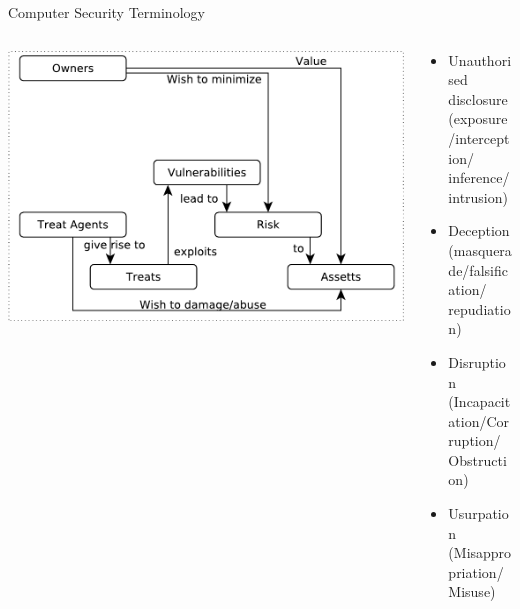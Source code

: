 \documentclass{beamer}
\begin{document}
\begin{frame}{Computer Security Terminology}
\begin{columns}[onlytextwidth]
    \begin{column}{0.6\textwidth}
\includegraphics[width=1\linewidth]{term-5}
  \end{column}
    \begin{column}{0.4\textwidth}
  \begin{itemize}
  \item Unauthorised disclosure\\
    (exposure/interception/\\
    inference/intrusion)
  \item Deception\\
    (masquerade/falsification/\\
    repudiation)
  \item Disruption\\
    (Incapacitation/Corruption/\\
    Obstruction)
  \item Usurpation\\
    (Misappropriation/Misuse)
  \end{itemize}
  \end{column}
\end{columns}
\end{frame}
\end{document}
